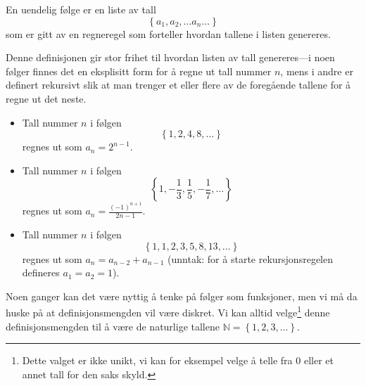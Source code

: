 \documentclass[a4paper,norsk,12pt]{article}
\newcounter{exa}
\begin{document}
\begin{tdef}
	En uendelig følge er en liste av tall
	\begin{displaymath}
		\left\{a_1, a_2,\ldots a_n\ldots\right\}
	\end{displaymath}
	som er gitt av en regneregel som forteller hvordan tallene i listen genereres.
\end{tdef}
Denne definisjonen gir stor frihet til hvordan listen av tall genereres---i noen følger finnes det en eksplisitt form for å regne ut tall nummer $n$, mens i andre er definert rekursivt slik at man trenger et eller flere av de foregående tallene for å regne ut det neste.

\begin{texample}
\begin{itemize}
\item
Tall nummer $n$ i følgen 
\begin{displaymath}
	\left\{1, 2, 4, 8, \ldots\right\}
\end{displaymath}
regnes ut som $a_n = 2^{n-1}$.
\item
Tall nummer $n$ i følgen
\begin{displaymath}
	\left\{1,-\frac13, \frac15, -\frac17,\ldots\right\}
\end{displaymath}
regnes ut som $a_n = \frac{(-1)^{n+1}}{2n-1}$.
\item
Tall nummer $n$ i følgen 
\begin{displaymath}
	\left\{1, 1, 2, 3, 5, 8, 13, \ldots \right\}
\end{displaymath}
regnes ut som $a_n = a_{n-2} + a_{n-1}$ (unntak: for å starte rekursjonsregelen defineres $a_1 = a_2 = 1$).
\end{itemize}
\end{texample}

Noen ganger kan det være nyttig å tenke på følger som funksjoner, men vi må da huske på at definisjonsmengden vil være diskret. Vi kan alltid velge\footnote{Dette valget er ikke unikt, vi kan for eksempel velge å telle fra 0 eller et annet tall for den saks skyld.} denne definisjonsmengden til å være de naturlige tallene $\mathbb{N}=\left\{1,2,3,\ldots\right\}$. 
\end{document}
